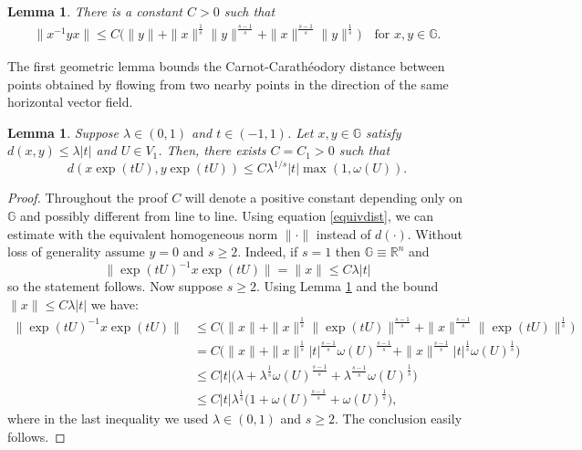 \documentclass[reqno, 11pt]{amsart}
\newtheorem{lemma}[theorem]{Lemma}
\theoremstyle{definition}
\theoremstyle{remark}
\numberwithin{theorem}{section}
\numberwithin{equation}{section}
\begin{document}
\begin{lemma}\label{stimagroup}
There is a constant $C>0$ such that
\begin{align*}
\|x^{-1}yx\|\leq C\Big(\|y\|+ \|x\|^{\frac{1}{s}}\|y\|^{\frac{s-1}{s}}+\|x\|^{\frac{s-1}{s}}\|y\|^{\frac{1}{s}}\Big)\quad \mbox{for } x,y\in\mathbb{G}.
\end{align*}
\end{lemma}

The first geometric lemma bounds the Carnot-Carath\'eodory distance between points obtained by flowing from two nearby points in the direction of the same horizontal vector field.

\begin{lemma}\label{distances}
Suppose $\lambda\in (0,1)$ and $t\in (-1,1)$. Let $x, y\in \mathbb{G}$ satisfy $d(x,y)\leq \lambda |t|$ and $U\in V_{1}$. Then, there exists $C=C_{1}>0$ such that
\[d(x\exp(tU),y\exp(tU))\leq C \lambda^{1/s}|t|\max(1,\omega(U)).\]
\end{lemma}

\begin{proof}
Throughout the proof $C$ will denote a positive constant depending only on $\mathbb{G}$ and possibly different from line to line.
Using equation \eqref{equivdist}, we can estimate with the equivalent homogeneous norm $\|\cdot \|$ instead of $d(\cdot)$. Without loss of generality assume $y=0$ and $s\geq 2$. Indeed, if $s=1$ then $\mathbb{G}\equiv\mathbb{R}^n$ and 
\[\|\exp(tU)^{-1}x\exp(tU)\|=\|x\|\leq C\lambda |t|\]
so the statement follows. Now suppose $s\geq 2$. Using Lemma \ref{stimagroup} and the bound $\|x\|\leq C\lambda |t|$ we have:
\begin{align*}
\|\exp(tU)^{-1}x\exp(tU)\|&\leq C\Big(\|x\|+\|x\|^{\frac{1}{s}}\|\exp(tU)\|^{\frac{s-1}{s}}+\|x\|^{\frac{s-1}{s}}\|\exp(tU)\|^{\frac{1}{s}}\Big)\\
&=C\Big(\|x\|+ \|x\|^{\frac{1}{s}}|t|^{\frac{s-1}{s}}\omega(U)^{\frac{s-1}{s}}+\|x\|^{\frac{s-1}{s}}|t|^{\frac{1}{s}}\omega(U)^{\frac{1}{s}}\Big)\\
&\leq C |t|\Big(\lambda +\lambda^{\frac{1}{s}}\omega(U)^{\frac{s-1}{s}}+\lambda^{\frac{s-1}{s}}\omega(U)^{\frac{1}{s}}\Big)\\
&\leq C |t| \lambda^{\frac{1}{s}}\Big(1+\omega(U)^{\frac{s-1}{s}}+\omega(U)^{\frac{1}{s}}\Big),
\end{align*}
where in the last inequality we used $\lambda\in (0,1)$ and $s\geq 2$. The conclusion easily follows.
\end{proof}
\end{document}
